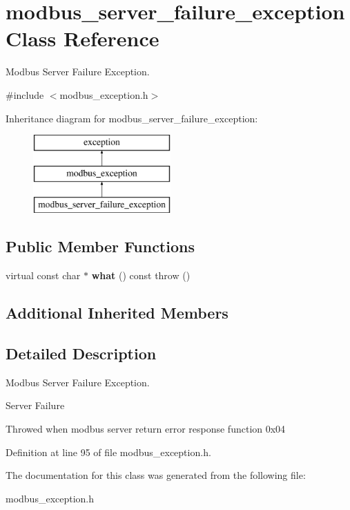 \hypertarget{classmodbus__server__failure__exception}{}\section{modbus\+\_\+server\+\_\+failure\+\_\+exception Class Reference}
\label{classmodbus__server__failure__exception}


Modbus Server Failure Exception.  




{\ttfamily \#include $<$modbus\+\_\+exception.\+h$>$}

Inheritance diagram for modbus\+\_\+server\+\_\+failure\+\_\+exception\+:\begin{figure}[H]
\begin{center}
\leavevmode
\includegraphics[height=3.000000cm]{classmodbus__server__failure__exception}
\end{center}
\end{figure}
\subsection*{Public Member Functions}
\begin{DoxyCompactItemize}
\item 
\mbox{\label{classmodbus__server__failure__exception_ac9031d4df9e2abd921b50b482aaaaab4}} 
virtual const char $\ast$ {\bfseries what} () const  throw ()
\end{DoxyCompactItemize}
\subsection*{Additional Inherited Members}


\subsection{Detailed Description}
Modbus Server Failure Exception. 

Server Failure

Throwed when modbus server return error response function 0x04 

Definition at line 95 of file modbus\+\_\+exception.\+h.



The documentation for this class was generated from the following file\+:\begin{DoxyCompactItemize}
\item 
modbus\+\_\+exception.\+h\end{DoxyCompactItemize}
